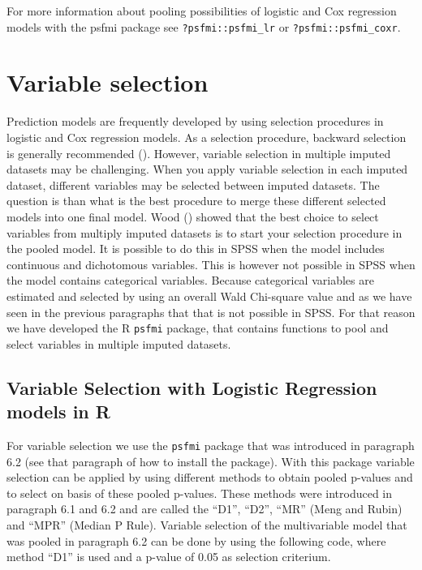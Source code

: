 \documentclass[]{book}
\begin{document}
For more information about pooling possibilities of logistic and Cox
regression models with the psfmi package see \texttt{?psfmi::psfmi\_lr}
or \texttt{?psfmi::psfmi\_coxr}.

\section{Variable selection}\label{variable-selection}

Prediction models are frequently developed by using selection procedures
in logistic and Cox regression models. As a selection procedure,
backward selection is generally recommended (\citet{Moons2015}).
However, variable selection in multiple imputed datasets may be
challenging. When you apply variable selection in each imputed dataset,
different variables may be selected between imputed datasets. The
question is than what is the best procedure to merge these different
selected models into one final model. Wood (\citet{Wood2008}) showed
that the best choice to select variables from multiply imputed datasets
is to start your selection procedure in the pooled model. It is possible
to do this in SPSS when the model includes continuous and dichotomous
variables. This is however not possible in SPSS when the model contains
categorical variables. Because categorical variables are estimated and
selected by using an overall Wald Chi-square value and as we have seen
in the previous paragraphs that that is not possible in SPSS. For that
reason we have developed the R \texttt{psfmi} package, that contains
functions to pool and select variables in multiple imputed datasets.

\subsection{Variable Selection with Logistic Regression models in
R}\label{variable-selection-with-logistic-regression-models-in-r}

For variable selection we use the \texttt{psfmi} package that was
introduced in paragraph 6.2 (see that paragraph of how to install the
package). With this package variable selection can be applied by using
different methods to obtain pooled p-values and to select on basis of
these pooled p-values. These methods were introduced in paragraph 6.1
and 6.2 and are called the ``D1'', ``D2'', ``MR'' (Meng and Rubin) and
``MPR'' (Median P Rule). Variable selection of the multivariable model
that was pooled in paragraph 6.2 can be done by using the following
code, where method ``D1'' is used and a p-value of 0.05 as selection
criterium.
\end{document}
